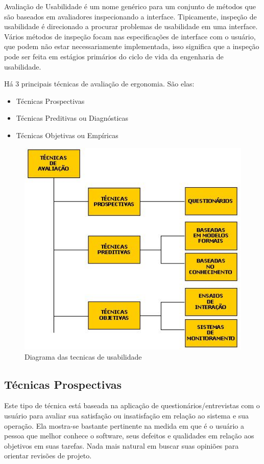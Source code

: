 Avaliação de Usabilidade é um nome genérico para um conjunto de métodos que são baseados em avaliadores inspecionando a interface. Tipicamente, inspeção de usabilidade é direcionado a procurar problemas de usabilidade em uma interface. Vários métodos de inspeção focam nas especificações de interface com o usuário, que podem não estar necessariamente implementada, isso significa que a inspeção pode ser feita em estágios primários do ciclo de vida da engenharia de usabilidade. \cite{nielsen_95}

Há 3 principais técnicas de avaliação de ergonomia. São elas:

\begin{itemize}
  \item Técnicas Prospectivas
  \item Técnicas Preditivas ou Diagnósticas
  \item Técnicas Objetivas ou Empíricas
\end{itemize}

\begin{figure}[here]
\includegraphics[width=120mm]{tecnicas_usabilidade.jpg}
\caption{Diagrama das tecnicas de usabilidade}
\label{fig:tecnicas_usabilidade}
\end{figure}

\subsection{Técnicas Prospectivas}

Este tipo de técnica está baseada na aplicação de questionários/entrevistas com o usuário para avaliar sua satisfação ou insatisfação em relação ao sistema e sua operação. Ela mostra-se bastante pertinente na medida em que é o usuário a pessoa que melhor conhece o software, seus defeitos e qualidades em relação aos objetivos em suas tarefas. Nada mais natural em buscar suas opiniões para orientar revisões de projeto.


